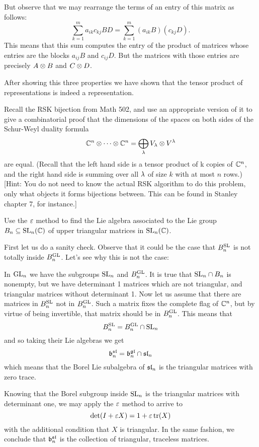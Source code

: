 \documentclass[12pt]{memoir}
\begin{document}
\begin{ptcbr}
    But observe that we may rearrange the terms of an entry of this matrix as follows: 
    $$\sum_{k=1}^{m}a_{ik}c_{kj}BD=\sum_{k=1}^{m}(a_{ik}B)(c_{kj}D).$$
    This means that this sum computes the entry of the product of matrices whose entries are the blocks $a_{ij}B$ and $c_{ij}D$. But the matrices with those entries are precisely $A\otimes B$ and $C\otimes D$.\par
    After showing this three properties we have shown that the tensor product of representations is indeed a representation. 
\end{ptcbr}
\begin{Ej}
    Recall the RSK bijection from Math 502, and use an appropriate version of it to give a combinatorial proof that the dimensions of the spaces on both sides of the Schur-Weyl duality formula
    $$\mathbb{C}^n\otimes\cdots\otimes\mathbb{C}^n=\bigoplus_\lambda V_\lambda\otimes V^\lambda$$
    are equal. (Recall that the left hand side is a tensor product of k copies of $\mathbb{C}^n$, and the right hand side
    is summing over all $\lambda$ of size $k$ with at most $n$ rows.)
    [Hint: You do not need to know the actual RSK algorithm to do this problem, only what objects it
    forms bijections between. This can be found in Stanley chapter 7, for instance.]
\end{Ej}

\begin{Ej}
    Use the $\varepsilon$ method to ﬁnd the Lie algebra associated to the Lie group $B_n\subseteq\mathrm{SL}_n(\mathbb{C})$ of upper
triangular matrices in $\mathrm{SL}_n(\mathbb{C})$.
\end{Ej}

\begin{ptcbr}
    First let us do a sanity check. Observe that it could be the case that $B^{\mathrm{SL}}_n$ is not totally inside $B^{\mathrm{GL}}_n$. Let's see why this is not the case:\par
    In $\mathrm{GL}_n$ we have the subgroups $\mathrm{SL}_n$ and $B_n^{\mathrm{GL}}$. It is true that $\mathrm{SL}_n\cap B_n$ is nonempty, but we have determinant 1 matrices which are not triangular, and triangular matrices without determinant 1. Now let us assume that there are matrices in $B^{\mathrm{SL}}_n$ not in $B^{\mathrm{GL}}_n$. Such a matrix fixes the complete flag of $\mathbb{C}^n$, but by virtue of being invertible, that matrix should be in $B^{\mathrm{GL}}_n$. This means that 
    $$B^{\mathrm{SL}}_n=B^{\mathrm{GL}}_n\cap\mathrm{SL}_n$$ 
    and so taking their Lie algebras we get 
    $$\mathfrak{b}^{\mathfrak{sl}}_n=\mathfrak{b}^{\mathfrak{gl}}_n\cap\mathfrak{sl}_n$$
    which means that the Borel Lie subalgebra of $\mathfrak{sl}_n$ is the triangular matrices with zero trace.\par
    Knowing that the Borel subgroup inside $\mathrm{SL}_n$ is the triangular matrices with determinant one, we may apply the $\varepsilon$ method to arrive to 
    $$\det(I+\varepsilon X)=1+\varepsilon\tr(X)$$
    with the additional condition that $X$ is triangular. In the same fashion, we conclude that $\mathfrak{b}^{\mathfrak{sl}}_n$ is the collection of triangular, traceless matrices.
\end{ptcbr}
\end{document}
